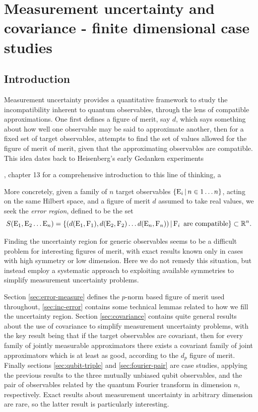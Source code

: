 
\chapter{Measurement uncertainty and covariance - finite dimensional case studies}
\label{chap:cov-meas-ur}
\section{Introduction}
Measurement uncertainty provides a quantitative framework to study the incompatibility inherent to quantum observables, through the lens of compatible approximations. One first defines a figure of merit, say $d$, which says something about how well one observable may be said to approximate another, then for a fixed set of target observables, attempts to find the set of values allowed for the figure of merit of merit, given that the approximating observables are compatible. This idea dates back to Heisenberg's early Gedanken experiments \cite{Heisenberg1927-Wheeler+Zurek}

 \cite{quantum-measurement-busch-et-al}, chapter 13 for a comprehensive introduction to this line of thinking, a 


More concretely, given a family of $n$ target observables $\left\{\operatorname{E}_i\,\middle|\,n\in1\hdots n\right\}$, acting on the same Hilbert space, and a figure of merit $d$ assumed to take real values, we seek the \emph{error region}, defined to be the set
\begin{equation}
  S(\operatorname{E}_1, \operatorname{E}_2\hdots \operatorname{E}_n) = \left\{(d(\operatorname{E}_1, \operatorname{F}_1), d(\operatorname{E}_2, \operatorname{F}_2)\hdots d(\operatorname{E}_n, \operatorname{F}_n))\,\middle|\,\operatorname{F}_i \text{ are compatible}\right\}\subset \mathbb{R}^n.
  \label{eqn:general-ur-definition}
\end{equation}

Finding the uncertainty region for generic observables seems to be a difficult problem for interesting figures of merit, with exact results known only in cases with high symmetry or low dimension\cite{yu-oh-qubit}\cite{dsw-meas-ur-ang-mom}. Here we do not remedy this situation, but instead employ a systematic approach to exploiting available symmetries to simplify measurement uncertainty problems. 

Section \ref{sec:error-measure} defines the $p$-norm based figure of merit used throughout, \ref{sec:inc-error} contains some technical lemmas related to how we fill the uncertainty region. Section \ref{sec:covariance} contains quite general results about the use of covariance to simplify measurement uncertainty problems, with the key result being that if the target observables are covariant, then for every family of jointly measurable approximators there exists a covariant family of joint approximators which is at least as good, according to the $d_p$ figure of merit. Finally sections \ref{sec:qubit-triple} and \ref{sec:fourier-pair} are case studies, applying the previous results to the three mutually unbiased qubit observables, and the pair of observables related by the quantum Fourier transform in dimension $n$, respectively. Exact results about measurement uncertainty in arbitrary dimension are rare, so the latter result is particularly interesting.

